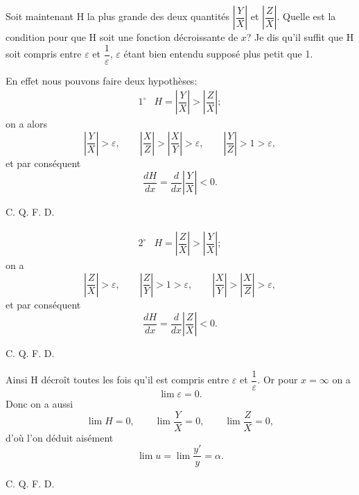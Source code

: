 \documentclass[11pt]{article}
\begin{document}
Soit maintenant H la plus grande des deux quantités $\left|\dfrac{Y}{X}\right|$ et $\left|\dfrac{Z}{X}\right|$. Quelle est la condition pour que H soit une fonction décroissante de $x$? Je dis qu'il suffit que H soit compris entre $\varepsilon$ et $\dfrac1\varepsilon$, $\varepsilon$ étant bien entendu supposé plus petit que 1.

En effet nous pouvons faire deux hypothèses:
\[
\begin{array}{rl}
1^\circ& H=\left|\dfrac{Y}{X}\right|>\left|\dfrac{Z}{X}\right|;
\end{array}
\]
on a alors
\[
\left|\frac{Y}{X}\right|>\varepsilon,
\qquad
\left|\frac{X}{Z}\right|>\left|\frac{X}{Y}\right|>\varepsilon,
\qquad
\left|\frac{Y}{Z}\right|>1>\varepsilon,
\]
et par conséquent
\[
\frac{dH}{dx}=\frac{d}{dx}\left|\frac{Y}{X}\right|<0.
\]
\begin{flushright}C. Q. F. D.\end{flushright}
\[
\begin{array}{rl}
2^\circ& H=\left|\dfrac{Z}{X}\right|>\left|\dfrac{Y}{X}\right|;
\end{array}
\]
on a
\[
\left|\frac{Z}{X}\right|>\varepsilon,
\qquad
\left|\frac{Z}{Y}\right|>1>\varepsilon,
\qquad
\left|\frac{X}{Y}\right|>\left|\frac{X}{Z}\right|>\varepsilon,
\]
et par conséquent
\[
\frac{dH}{dx}=\frac{d}{dx}\left|\frac{Z}{X}\right|<0.
\]
\begin{flushright}C. Q. F. D.\end{flushright}
Ainsi H décroît toutes les fois qu'il est compris entre $\varepsilon$ et $\dfrac1\varepsilon$. Or pour $x=\infty$ on a
\[
\lim\varepsilon=0.
\]
Donc on a aussi
\[
\lim H=0,
\qquad
\lim\frac{Y}{X}=0,
\qquad
\lim\frac{Z}{X}=0,
\]
d'où l'on déduit aisément
\[
\lim u=\lim\frac{y'}{y}=\alpha.
\]
\begin{flushright}C. Q. F. D.\end{flushright}
\end{document}
